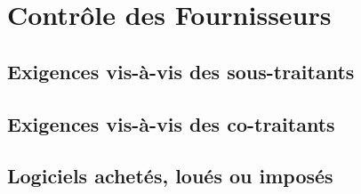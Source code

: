 \section{Contrôle des Fournisseurs}

\subsection{Exigences vis-à-vis des sous-traitants}

\subsection{Exigences vis-à-vis des co-traitants}

\subsection{Logiciels achetés, loués ou imposés}
